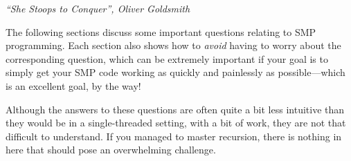 
%
	 {\emph{``She Stoops to Conquer'', Oliver Goldsmith}}

The following sections discuss some important questions relating to
SMP programming.
Each section also shows how to {\em avoid} having to worry about
the corresponding question, which can be extremely important if
your goal is to simply get your SMP code working as quickly and
painlessly as possible---which is an excellent goal, by the way!

Although the answers to these questions are often quite a bit less
intuitive than they would be in a single-threaded setting,
with a bit of work, they are not that difficult to understand.
If you managed to master recursion, there is nothing in here that should
pose an overwhelming challenge.






